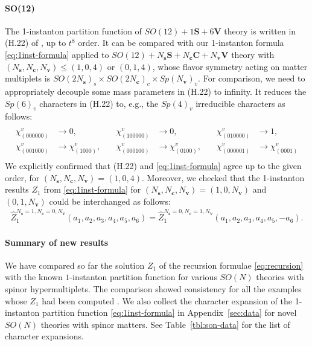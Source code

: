 \documentclass[letterpaper, 11pt]{article}
\begin{document}
{\paragraph{SO(12)}

The 1-instanton partition function of $SO(12) + 1\mathbf{S} + 6\mathbf{V}$ theory  is written in (H.22) of \cite{DelZotto:2018tcj}, up to $t^8$ order. It can be compared with our 1-instanton formula \eqref{eq:1inst-formula} applied to $SO(12) + N_\mathbf{s}\mathbf{S} + N_\mathbf{c}\mathbf{C} + N_\mathbf{v}\mathbf{V}$ theory with $(N_\mathbf{s},N_\mathbf{c}, N_{\mathbf{v}}) \leq (1,0,4)$ or $(0,1,4)$, whose flavor symmetry acting on matter multiplets is $SO(2N_\mathbf{s})_s \times SO(2N_\mathbf{c})_c \times Sp(N_\mathbf{v})_v$. For comparison, we need to appropriately decouple some mass parameters in (H.22) to infinity. It reduces the $Sp(6)_v$ characters in (H.22) to, e.g., the $Sp(4)_v$ irreducible characters as follows:
\begin{align}
\begin{split}
\begin{array}{llllll}
  \chi^{v}_{(000000)} &\rightarrow 0, & \quad \chi^{v}_{(100000)}&\rightarrow 0,& \quad \chi^{v}_{(010000)}&\rightarrow 1, \\ \chi^{v}_{(001000)}&\rightarrow \chi^{v}_{(1000)}, & \quad  \chi^{v}_{(000100)}&\rightarrow \chi^{v}_{(0100)}, & \quad \chi^{v}_{(000001)}&\rightarrow \chi^{v}_{(0001)}
\end{array}
\end{split}
\end{align}
We explicitly confirmed that (H.22) and \eqref{eq:1inst-formula} agree up to the given order, for $(N_\mathbf{s},N_\mathbf{c}, N_{\mathbf{v}}) = (1,0,4)$. Moreover, we checked that the 1-instanton results ${Z}_1$ from \eqref{eq:1inst-formula} for $(N_\mathbf{s},N_\mathbf{c}, N_{\mathbf{v}})= (1,0,N_\mathbf{v})$ and $(0,1,N_\mathbf{v})$ could be interchanged as follows: 
\begin{align}
  \hat{Z}_{1}^{N_{\mathbf{s}}=1,N_\mathbf{c}=0,N_{\mathbf{v}}}(a_1,a_2,a_3,a_4,a_5,a_6) = \hat{Z}_{1}^{N_{\mathbf{s}}=0,N_\mathbf{c}=1,N_{\mathbf{v}}}(a_1,a_2,a_3,a_4,a_5,-a_6).
\end{align}


\paragraph{Summary of new results}
We have compared so far the solution $Z_1$ of the recursion formulae \eqref{eq:recursion} with the known $1$-instanton partition function   for various $SO(N)$ theories with spinor hypermultiplets. The comparison showed consistency for all the examples whose $Z_1$ had been computed \cite{Kim:2018gjo,DelZotto:2018tcj}. We also collect the character expansion of the 1-instanton partition function \eqref{eq:1inst-formula} in Appendix~\ref{sec:data} for novel $SO(N)$ theories with spinor matters. See Table~\ref{tbl:son-data} for the list of character expansions.


}
\end{document}

